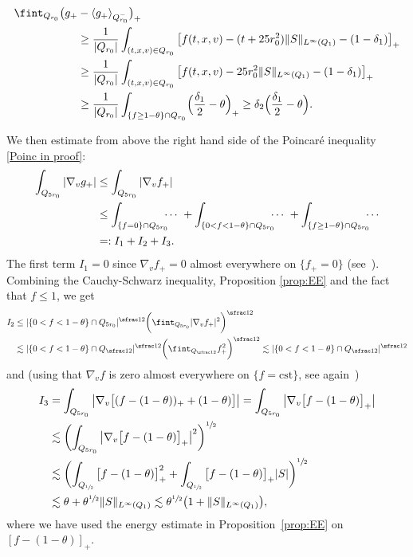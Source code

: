 \documentclass[JEP,XML,SOM,Unicode,NoFloatCountersInSection,published]{cedram}
\theoremstyle{definition}
\theoremstyle{remark}
\begin{document}
\begin{equation}\label{lower bd Poinc}
\begin{aligned}
\fint_{Q_{r_0}} \bigl(g_+&-\langle g_+
\rangle_{Q_{r_0}^{-}}\bigr)_{+} \\
&\ge \frac{1}{|Q_{r_0}|} \int_{(t,x,v) \in Q_{r_0}}
\big[ f(t,x,v) - (t+25r_0^2) \|S\|_{L^\infty(Q_1)}
-(1-\delta_1)\big]_{+}\\
&\ge \frac{1}{|Q_{r_0}|} \int_{(t,x,v) \in Q_{r_0}}
\big[ f(t,x,v) - 25r_0^2 \|S\|_{L^\infty(Q_1)}
-(1-\delta_1)\big]_{+}\\
&\geq \frac{1}{|Q_{r_0}|}
\int_{\{f\geq 1-\theta\}\cap Q_{r_0}}
\Bigl(\frac{\delta_1}{2}-\theta\Bigr)_{+}
\ge \delta_2 \Bigl(\frac{\delta_1}{2}-\theta\Bigr).
\end{aligned}
\end{equation}

We then estimate from above the right hand side of the Poincaré
inequality \eqref{Poinc in proof}:\vspace*{-3pt}
\begin{align*}
\int_{Q_{5r_0}} |\nabla_v g_+| &\le \int_{Q_{5r_0}}
|\nabla_v f_+| \\
&\le \int_{\{ f=0 \} \cap Q_{5r_0}} \hspace*{-2mm}\cdots\
+\int_{\{ 0<f<1-\theta \} \cap Q_{5r_0}} \hspace*{-2mm}\cdots\
+ \int_{\{ f\geq 1-\theta \} \cap Q_{5r_0}} \hspace*{-2mm}\cdots\\
&=: I_1 +I_2 + I_3.
\end{align*}
The first term $I_1=0$ since $\nabla_v f_+ = 0$ almost everywhere
on $\{f_+=0\}$
(see~\cite[\S 4.2.2]{MR3409135}). Combining the
Cauchy-Schwarz inequality, Proposition \ref{prop:EE} and the fact
that $f\leq 1$, we get
\begin{align*}
I_2& \leq |\{0<f<1-\theta\}\cap Q_{5r_0}|^{\sfrac12}\biggl(
\fint_{Q_{5r_0}} |\nabla_v f_+|^2 \biggr)^{\sfrac12} \\
& \lesssim
|\{0<f<1-\theta\}\cap Q_{\sfrac12}|^{\sfrac12}
\biggl(\fint_{Q_{\sfrac12}} f_+^2 \biggr)^{\sfrac12}
\lesssim |\{0<f<1-\theta\}\cap Q_{\sfrac12}|^{\sfrac12}
\end{align*}
and (using that $\nabla_v f$ is zero almost everywhere on
$\{ f = \text{cst} \}$, see
again~\cite[\S 4.2.2]{MR3409135})
\begin{align*}
I_3 &= \int_{Q_{5r_0}} \big|\nabla_v
\big[(f-(1-\theta))_+ +(1-\theta) \big]\big|= \int_{Q_{5r_0}}
\big|\nabla_v \big[f-(1-\theta)\big]_+\big| \\
&\lesssim \biggl( \int_{Q_{5r_0}}
\big|\nabla_v \big[f-(1-\theta)\big]_+\big|^2
\biggr)^{\sfrac12} \\
&\lesssim \biggl( \int_{Q_{\sfrac12}}
\big[f-(1-\theta)\big]_+^2
+ \int_{Q_{\sfrac12}}
\big[f-(1-\theta)\big]_+ |S| \biggr)^{\sfrac12}\\
&\lesssim \theta + \theta^{\sfrac12}\|S\|_{L^\infty(Q_1)}
\lesssim \theta^{\sfrac12}\bigl(1+\|S\|_{L^\infty(Q_1)}\bigr),
\end{align*}
where we have used the energy estimate in
Proposition~\ref{prop:EE} on $[f-(1-\theta)]_+$.
\end{document}
